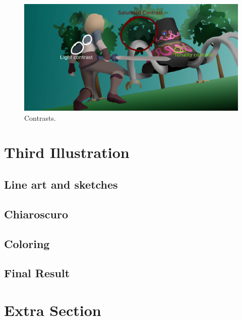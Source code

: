 \documentclass{cup-pan}
\begin{document}
            \begin{figure}[H]
                \includegraphics[width=\textwidth]{Imagenes/Fanart2/Analysis/contraste.png}
                \caption{Contrasts.}
            \end{figure}
\newpage
\newpage
\section{Third Illustration}

    \subsection{Line art and sketches}

    \subsection{Chiaroscuro}

    \subsection{Coloring}

    \subsection{Final Result}
    \newpage
\newpage

\section{Extra Section}
\end{document}
